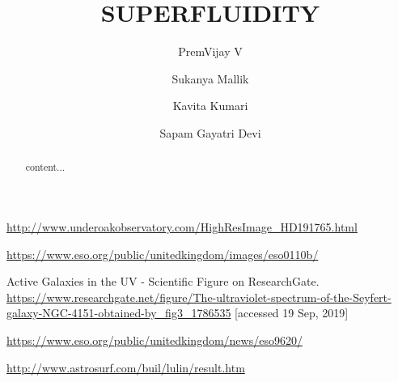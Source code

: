 \documentclass[11pt]{report}
\title{SUPERFLUIDITY}
\author[1]{ PremVijay V}
\author[1]{	Sukanya Mallik}
\author[1]{	Kavita Kumari}
\author[1]{	Sapam Gayatri Devi}
\affil[1]{The Inter-University Centre for Astronomy and Astrophysics}
\begin{document}
\maketitle

\begin{abstract}
	content...
\end{abstract}

\begin{thebibliography}{9}
	
	\url{http://www.underoakobservatory.com/HighResImage_HD191765.html}
	
	\url{https://www.eso.org/public/unitedkingdom/images/eso0110b/}
	
	Active Galaxies in the UV - Scientific Figure on ResearchGate. \url{https://www.researchgate.net/figure/The-ultraviolet-spectrum-of-the-Seyfert-galaxy-NGC-4151-obtained-by_fig3_1786535} [accessed 19 Sep, 2019]
	
	\url{https://www.eso.org/public/unitedkingdom/news/eso9620/}
	
	\url{http://www.astrosurf.com/buil/lulin/result.htm}
	
	
	
	
\end{thebibliography}
\end{document}
